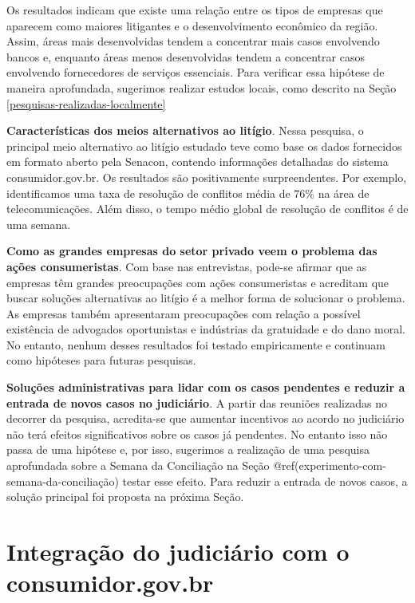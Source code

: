 \documentclass[]{report}
\begin{document}
Os resultados indicam que existe uma relação entre os tipos de empresas
que aparecem como maiores litigantes e o desenvolvimento econômico da
região. Assim, áreas mais desenvolvidas tendem a concentrar mais casos
envolvendo bancos e, enquanto áreas menos desenvolvidas tendem a
concentrar casos envolvendo fornecedores de serviços essenciais. Para
verificar essa hipótese de maneira aprofundada, sugerimos realizar
estudos locais, como descrito na Seção
\ref{pesquisas-realizadas-localmente}

\textbf{Características dos meios alternativos ao litígio}. Nessa
pesquisa, o principal meio alternativo ao litígio estudado teve como
base os dados fornecidos em formato aberto pela Senacon, contendo
informações detalhadas do sistema consumidor.gov.br. Os resultados são
positivamente surpreendentes. Por exemplo, identificamos uma taxa de
resolução de conflitos média de 76\% na área de telecomunicações. Além
disso, o tempo médio global de resolução de conflitos é de uma semana.

\textbf{Como as grandes empresas do setor privado veem o problema das
ações consumeristas}. Com base nas entrevistas, pode-se afirmar que as
empresas têm grandes preocupações com ações consumeristas e acreditam
que buscar soluções alternativas ao litígio é a melhor forma de
solucionar o problema. As empresas também apresentaram preocupações com
relação a possível existência de advogados oportunistas e indústrias da
gratuidade e do dano moral. No entanto, nenhum desses resultados foi
testado empiricamente e continuam como hipóteses para futuras pesquisas.

\textbf{Soluções administrativas para lidar com os casos pendentes e
reduzir a entrada de novos casos no judiciário}. A partir das reuniões
realizadas no decorrer da pesquisa, acredita-se que aumentar incentivos
ao acordo no judiciário não terá efeitos significativos sobre os casos
já pendentes. No entanto isso não passa de uma hipótese e, por isso,
sugerimos a realização de uma pesquisa aprofundada sobre a Semana da
Conciliação na Seção @ref(experimento-com-semana-da-conciliação) testar
esse efeito. Para reduzir a entrada de novos casos, a solução principal
foi proposta na próxima Seção.

\section{Integração do judiciário com o
consumidor.gov.br}\label{integracao-do-judiciario-com-o-consumidor.gov.br}
\end{document}
